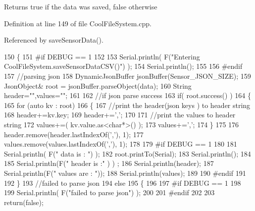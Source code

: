 \begin{DoxyReturn}{Returns}
true if the data was saved, false otherwise 
\end{DoxyReturn}


Definition at line 149 of file Cool\+File\+System.\+cpp.



Referenced by save\+Sensor\+Data().


\begin{DoxyCode}
150 \{
151 \textcolor{preprocessor}{#if DEBUG == 1}
152 
153     Serial.println( F(\textcolor{stringliteral}{"Entering CoolFileSystem.saveSensorDataCSV()"}) );
154     Serial.println();
155 
156 \textcolor{preprocessor}{#endif}
157     \textcolor{comment}{//parsing json}
158     DynamicJsonBuffer jsonBuffer(Sensor\_JSON\_SIZE);
159     JsonObject& root = jsonBuffer.parseObject(data);
160     String header=\textcolor{stringliteral}{""},values=\textcolor{stringliteral}{""};
161     
162     \textcolor{comment}{//if json parse success}
163     \textcolor{keywordflow}{if}( root.success() )
164     \{       
165         \textcolor{keywordflow}{for} (\textcolor{keyword}{auto} kv : root) 
166         \{
167             \textcolor{comment}{//print the header(json keys ) to header string}
168             header+=kv.key;
169             header+=\textcolor{charliteral}{','};
170             
171             \textcolor{comment}{//print the values to header string}
172             values+=( kv.value.as<\textcolor{keywordtype}{char}*>() );
173             values+=\textcolor{charliteral}{','};
174         \}
175 
176         header.remove(header.lastIndexOf(\textcolor{charliteral}{','}), 1);
177         values.remove(values.lastIndexOf(\textcolor{charliteral}{','}), 1);      
178     
179 \textcolor{preprocessor}{    #if DEBUG == 1}
180     
181         Serial.println( F(\textcolor{stringliteral}{" data is : "}) );
182         root.printTo(Serial);
183         Serial.println();
184         
185         Serial.println(F(\textcolor{stringliteral}{" header is :"} ) ) ;
186         Serial.println(header);
187         Serial.println(F(\textcolor{stringliteral}{" values are : "}));
188         Serial.println(values);
189     
190 \textcolor{preprocessor}{    #endif}
191     
192     \}
193     \textcolor{comment}{//failed to parse json}
194     \textcolor{keywordflow}{else}
195     \{
196     
197 \textcolor{preprocessor}{    #if DEBUG == 1}
198 
199         Serial.println( F(\textcolor{stringliteral}{"failed to parse json"}) );
200     
201 \textcolor{preprocessor}{    #endif}
202 
203         \textcolor{keywordflow}{return}(\textcolor{keyword}{false});

\end{DoxyCode}
